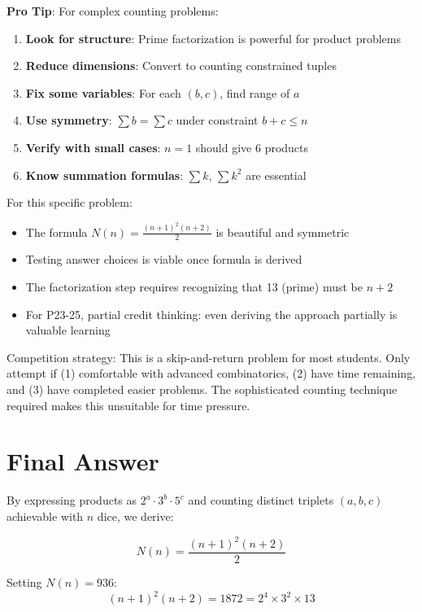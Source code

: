\documentclass[12pt]{article}
\begin{document}
\begin{tipbox}
\textbf{Pro Tip}: For complex counting problems:

\begin{enumerate}
    \item \textbf{Look for structure}: Prime factorization is powerful for product problems
    \item \textbf{Reduce dimensions}: Convert to counting constrained tuples
    \item \textbf{Fix some variables}: For each $(b,c)$, find range of $a$
    \item \textbf{Use symmetry}: $\sum b = \sum c$ under constraint $b+c \leq n$
    \item \textbf{Verify with small cases}: $n=1$ should give 6 products
    \item \textbf{Know summation formulas}: $\sum k$, $\sum k^2$ are essential
\end{enumerate}

For this specific problem:
\begin{itemize}
    \item The formula $N(n) = \frac{(n+1)^2(n+2)}{2}$ is beautiful and symmetric
    \item Testing answer choices is viable once formula is derived
    \item The factorization step requires recognizing that 13 (prime) must be $n+2$
    \item For P23-25, partial credit thinking: even deriving the approach partially is valuable learning
\end{itemize}

Competition strategy: This is a skip-and-return problem for most students. Only attempt if (1) comfortable with advanced combinatorics, (2) have time remaining, and (3) have completed easier problems. The sophisticated counting technique required makes this unsuitable for time pressure.
\end{tipbox}

\section*{Final Answer}

By expressing products as $2^a \cdot 3^b \cdot 5^c$ and counting distinct triplets $(a,b,c)$ achievable with $n$ dice, we derive:

$$N(n) = \frac{(n+1)^2(n+2)}{2}$$

Setting $N(n) = 936$:
$$(n+1)^2(n+2) = 1872 = 2^4 \times 3^2 \times 13$$
\end{document}
